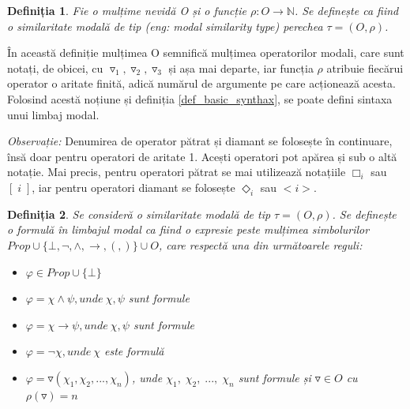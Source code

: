 \documentclass[12pt, openany]{book}
\newtheorem{definition}{Definiția}[chapter] %
\newcommand{\myenglishterm}[1]{(\textit{eng: #1})}
\begin{document}
            \begin{definition}
                Fie o mulțime nevidă O și o funcție $\rho:O\rightarrow\mathbb{N}$. Se definește ca fiind o similaritate 
                modală de tip \myenglishterm{modal similarity type} perechea $\tau=(O,\rho)$.
            \end{definition}

            \par{}
                În această definiție mulțimea O semnifică mulțimea operatorilor modali, care sunt notați, de obicei, cu 
                $\triangledown_1, \triangledown_2, \triangledown_3$ și așa mai departe, iar funcția $\rho$ atribuie fiecărui 
                operator o aritate finită, adică numărul de argumente pe care acționează acesta. Folosind acestă 
                noțiune și definiția \ref{def_basic_synthax}, se poate defini sintaxa unui limbaj modal.

            \par{}
                \noindent \textit{Observație:} Denumirea de operator pătrat și diamant se folosește în continuare, însă doar
                pentru operatori de aritate 1. Acești operatori pot apărea și sub o altă notație. Mai precis, pentru operatori pătrat se 
                mai utilizează notațiile $\Box_i$ sau $[\;i\;]$, iar pentru operatori diamant se folosește $\Diamond_i$ sau 
                $<i>$.

            \begin{definition}
                Se consideră o similaritate modală de tip $\tau=(O,\rho)$. Se definește o formulă în limbajul modal ca fiind
                o expresie peste mulțimea simbolurilor $Prop \cup \{\bot, \neg, \wedge, \rightarrow, (, )\} \cup O$, care 
                respectă una din următoarele reguli:
                \begin{itemize}
                    \item $\varphi \in Prop \cup \{\bot\}$
                    \item $\varphi = \chi \wedge \psi, unde\: \chi,\psi$ sunt formule
                    \item $\varphi = \chi \rightarrow \psi, unde\: \chi,\psi$ sunt formule
                    \item $\varphi = \neg \chi, unde\: \chi$ este formulă
                    \item $\varphi = \triangledown (\chi_1, \chi_2, ..., \chi_n)$, unde $\chi_1,\;\chi_2,\;...,\;\chi_n$ 
                    sunt formule și $\triangledown \in O$ cu $\rho(\triangledown)=n$
                \end{itemize}
            \end{definition}
\end{document}
